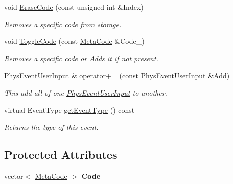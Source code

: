 \begin{DoxyCompactItemize}
void \hyperlink{classPhysEventUserInput_a8cbbee3c2be3bd12746ad442fce526e4}{EraseCode} (const unsigned int \&Index)
\begin{DoxyCompactList}\small\item\em Removes a specific code from storage. \item\end{DoxyCompactList}\item 
void \hyperlink{classPhysEventUserInput_a8325bb0172db6ea02fd06f4a5d1a7378}{ToggleCode} (const \hyperlink{classphys_1_1MetaCode}{MetaCode} \&Code\_\-)
\begin{DoxyCompactList}\small\item\em Removes a specific code or Adds it if not present. \item\end{DoxyCompactList}\item 
\hyperlink{classPhysEventUserInput}{PhysEventUserInput} \& \hyperlink{classPhysEventUserInput_a257c2e093b5736324e39d5fac0d6de2a}{operator+=} (const \hyperlink{classPhysEventUserInput}{PhysEventUserInput} \&Add)
\begin{DoxyCompactList}\small\item\em This add all of one \hyperlink{classPhysEventUserInput}{PhysEventUserInput} to another. \item\end{DoxyCompactList}\item 
virtual EventType \hyperlink{classPhysEventUserInput_a886530fc5d51bb30bb45a9d43011f32a}{getEventType} () const 
\begin{DoxyCompactList}\small\item\em Returns the type of this event. \item\end{DoxyCompactList}\end{DoxyCompactItemize}
\subsection*{Protected Attributes}
\begin{DoxyCompactItemize}
\item 
\hypertarget{classPhysEventUserInput_a51607772d8a5b9f401ad0efc964ec129}{
vector$<$ \hyperlink{classphys_1_1MetaCode}{MetaCode} $>$ {\bfseries Code}}
\label{dc/d0e/classPhysEventUserInput_a51607772d8a5b9f401ad0efc964ec129}

\end{DoxyCompactItemize}


